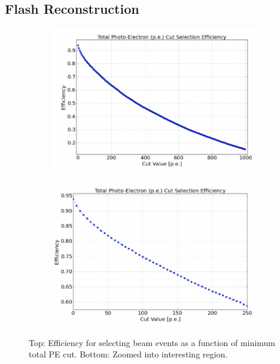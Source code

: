 \subsection{Flash Reconstruction}
\begin{figure}[htp!]
\centering
	\begin{subfigure}[b]{.6\textwidth}
	\includegraphics[width=\textwidth]{figs/totalpecut.png}
	\end{subfigure}
	\quad
	\begin{subfigure}[b]{.6\textwidth}
	\includegraphics[width=\textwidth]{figs/totalpe_zoomed.png}
	\end{subfigure}
	\quad
\caption{Top: Efficiency for selecting beam events as a function of minimum total PE cut. Bottom: Zoomed into interesting region.}
\label{fig:PE}
\end{figure}
